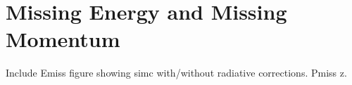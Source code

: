 \section{Missing Energy and Missing Momentum}

Include Emiss figure showing simc with/without radiative corrections.
Pmiss z.


